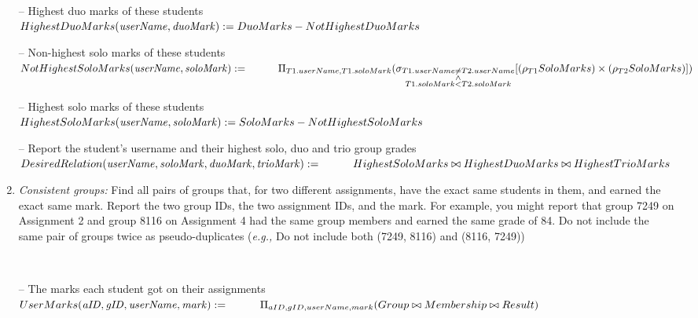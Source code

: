 \documentclass{article}
\newcommand{\var}[1]{\mathit{#1}}
\begin{document}
\begin{enumerate}
{-- Highest duo marks of these students \\[5pt]
$
HighestDuoMarks(\var{userName, duoMark}) :=
    DuoMarks - NotHighestDuoMarks \\[10pt]
$

-- Non-highest solo marks of these students \\[5pt]
$
NotHighestSoloMarks(\var{userName, soloMark}) := \\[5pt]
    \hspace*{1cm}
    \Pi_{T1.userName, T1.soloMark}
    (\sigma_{\substack{T1.userName \neq T2.userName \\ \wedge \\ T1.soloMark < T2.soloMark}}
    [(\rho_{T1}SoloMarks) \times (\rho_{T2}SoloMarks)]) \\[10pt]
$

-- Highest solo marks of these students \\[5pt]
$
HighestSoloMarks(\var{userName, soloMark}) :=
    SoloMarks - NotHighestSoloMarks \\[10pt]
$

-- Report the student's username and their highest solo, duo and trio group grades \\[5pt]
$
DesiredRelation(\var{userName, soloMark, duoMark, trioMark}) := \\[5pt]
    \hspace*{1cm}
    HighestSoloMarks \bowtie HighestDuoMarks \bowtie HighestTrioMarks \\[10pt]
$
} %

\newpage

\item   %
\textit{Consistent groups:}
Find all pairs of groups that, for two different assignments,
have the exact same students in them,
and earned the exact same mark.
Report the two group IDs, the two assignment IDs, and the mark.
For example, you might report that group 7249 on Assignment 2 and group 8116 on Assignment 4
had the same group members and earned the same grade of 84. 
Do not include the same pair of groups twice as pseudo-duplicates
({\it e.g.,} Do not include both (7249, 8116) and (8116, 7249))

{~}\\ %
{\large %
-- The marks each student got on their assignments \\[5pt]
$
UserMarks(\var{aID, gID, userName, mark}) := \\[5pt]
    \hspace*{1cm}
	\Pi_{aID, gID, userName, mark} (Group \bowtie Membership \bowtie Result) \\[10pt]
$

}
\end{enumerate}
\end{document}
